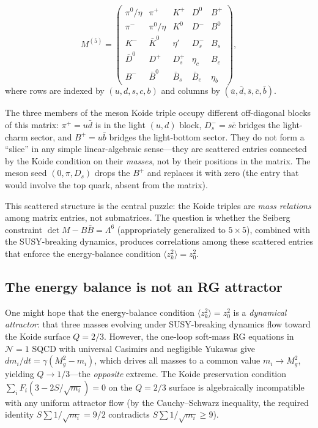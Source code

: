 \documentclass[12pt,a4paper]{article}
\begin{document}
\begin{equation}
M^{(5)} = \begin{pmatrix}
\pi^0/\eta & \boxed{\pi^+} & K^+ & D^0 & \boxed{B^+} \\
\pi^- & \pi^0/\eta & K^0 & D^- & B^0 \\
K^- & \bar{K}^0 & \eta' & \boxed{D_s^-} & B_s \\
\bar{D}^0 & D^+ & D_s^+ & \eta_c & B_c \\
B^- & \bar{B}^0 & \bar{B}_s & \bar{B}_c & \eta_b
\end{pmatrix},
\end{equation}
where rows are indexed by $(u, d, s, c, b)$ and columns by 
$(\bar{u}, \bar{d}, \bar{s}, \bar{c}, \bar{b})$.

The three members of the meson Koide triple occupy different 
off-diagonal blocks of this matrix: $\pi^+ = u\bar{d}$ is in the 
light $(u,d)$ block, $D_s^- = s\bar{c}$ bridges the light-charm 
sector, and $B^+ = u\bar{b}$ bridges the light-bottom sector. They 
do not form a ``slice'' in any simple linear-algebraic sense---they 
are scattered entries connected by the Koide condition on their 
\emph{masses}, not by their positions in the matrix. The meson seed 
$(0, \pi, D_s)$ drops the $B^+$ and replaces it with zero (the 
entry that would involve the top quark, absent from the matrix).

This scattered structure is the central puzzle: the Koide triples 
are \emph{mass relations} among matrix entries, not submatrices. 
The question is whether the Seiberg constraint 
$\det M - B\bar{B} = \Lambda^6$ (appropriately generalized to 
$5 \times 5$), combined with the SUSY-breaking dynamics, produces 
correlations among these scattered entries that enforce the 
energy-balance condition $\langle z_k^2\rangle = z_0^2$.

\subsection{The energy balance is not an RG attractor}
\label{subsec:fixedpoint}
One might hope that the energy-balance condition
$\langle z_k^2\rangle = z_0^2$ is a \emph{dynamical attractor}:
that three masses evolving under SUSY-breaking dynamics flow toward
the Koide surface $Q = 2/3$. However, the one-loop soft-mass RG
equations in $\mathcal{N}=1$ SQCD with universal Casimirs and
negligible Yukawas give $dm_i/dt = \gamma(M_g^2 - m_i)$, which
drives all masses to a common value $m_i \to M_g^2$, yielding
$Q \to 1/3$---the \emph{opposite} extreme. The Koide preservation
condition $\sum_i F_i(3 - 2S/\sqrt{m_i}) = 0$ on the $Q = 2/3$
surface is algebraically incompatible with any uniform attractor
flow (by the Cauchy--Schwarz inequality, the required identity
$S\sum 1/\sqrt{m_i} = 9/2$ contradicts $S\sum 1/\sqrt{m_i} \geq 9$).
\end{document}
